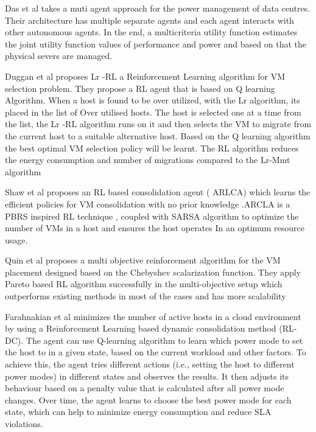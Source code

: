 \documentclass[a4paper,12pt]{Classes/RoboticsLaTeX}
\begin{document}
    Das et al \cite{das2008autonomic}takes a muti agent approach for the power management of data centres. Their architecture has multiple separate agents and each agent interacts with other autonomous agents. In the end, a  multicriteria utility function estimates the joint utility function values of performance and power and based on that the physical severs are managed.
    
    Duggan et al \cite{duggan2016reinforcement}proposes Lr -RL a Reinforcement Learning   algorithm for VM selection problem. They propose a RL agent that is based on Q learning Algorithm. When a host is found to be over utilized, with the Lr algorithm, its placed in the list of Over utilised hosts. The host is selected one at a time from the list, the Lr -RL algorithm runs on it and then selects the VM to migrate from the current host to a suitable alternative host. Based on the Q learning algorithm the best optimal VM selection policy will be learnt. The RL algorithm reduces the energy consumption and number of migrations compared to the Lr-Mmt algorithm
    
    Shaw et al \cite{shaw2017advanced} proposes an RL based consolidation agent ( ARLCA) which learns the efficient policies for VM consolidation with no prior knowledge .ARCLA is a PBRS inspired RL technique , coupled with SARSA algorithm to  optimize the number of VMs in a host and ensures the host operates In an optimum resource usage.

    Quin et al \cite{qin2020virtual}proposes a multi objective reinforcement algorithm for the VM placement designed based on the Chebyshev scalarization function. They apply Pareto based RL algorithm successfully in the multi-objective setup which outperforms existing methods in most of the cases and has more scalability
    
    Farahnakian et al \cite{farahnakian2014energy} minimizes the number of active hosts in a cloud environment by using a Reinforcement Learning based dynamic consolidation method (RL-DC). The agent can use Q-learning algorithm to learn which power mode to set the host to in a given state, based on the current workload and other factors. To achieve this, the agent tries different actions (i.e., setting the host to different power modes) in different states and observes the results. It then adjusts its behaviour based on a penalty value that is calculated after all power mode changes. Over time, the agent learns to choose the best power mode for each state, which can help to minimize energy consumption and reduce SLA violations.
    
\end{document}
